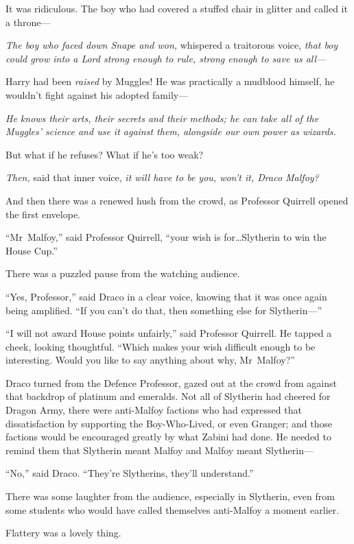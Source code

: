It was ridiculous. The boy who had covered a stuffed chair in glitter and
called it a throne—

\emph{The boy who faced down Snape and won,} whispered a traitorous voice,
\emph{that boy could grow into a Lord strong enough to rule, strong enough to
save us all—}

Harry had been \emph{raised} by Muggles! He was practically a mudblood himself,
he wouldn’t fight against his adopted family—

\emph{He knows their arts, their secrets and their methods; he can take all of
the Muggles’ science and use it against them, alongside our own power as
wizards.}

But what if he refuses? What if he’s too weak?

\emph{Then,} said that inner voice, \emph{it will have to be you, won’t it,
Draco Malfoy?}

And then there was a renewed hush from the crowd, as Professor Quirrell opened
the first envelope.

“Mr~Malfoy,” said Professor Quirrell, “your wish is for…Slytherin to
win the House Cup.”

There was a puzzled pause from the watching audience.

“Yes, Professor,” said Draco in a clear voice, knowing that it was once again
being amplified. “If you can’t do that, then something else for Slytherin—”

“I will not award House points unfairly,” said Professor Quirrell. He tapped a
cheek, looking thoughtful. “Which makes your wish difficult enough to be
interesting. Would you like to say anything about why, Mr~Malfoy?”

Draco turned from the Defence Professor, gazed out at the crowd from against
that backdrop of platinum and emeralds. Not all of Slytherin had cheered for
Dragon Army, there were anti-Malfoy factions who had expressed that
dissatisfaction by supporting the Boy-Who-Lived, or even Granger; and those
factions would be encouraged greatly by what Zabini had done. He needed to
remind them that Slytherin meant Malfoy and Malfoy meant Slytherin—

“No,” said Draco. “They’re Slytherins, they’ll understand.”

There was some laughter from the audience, especially in Slytherin, even from
some students who would have called themselves anti-Malfoy a moment earlier.

Flattery was a lovely thing.

